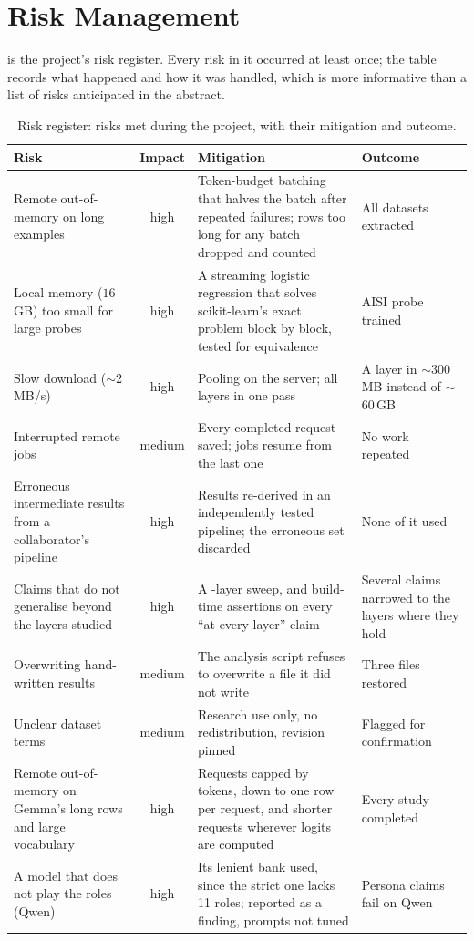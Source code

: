 \section{Risk Management}
\label{sec:risk}

 is the project's risk register. Every risk in it occurred at least once; the table
records what happened and how it was handled, which is more informative than a list of risks
anticipated in the abstract.

\begin{table}[t]
\centering
\small
\caption{Risk register: risks met during the project, with their mitigation and outcome.}
\label{tab:risk}
\begin{tabularx}{\linewidth}{@{}>{\raggedright\arraybackslash}p{3.0cm} c >{\raggedright\arraybackslash}X >{\raggedright\arraybackslash}p{3.1cm}@{}}
\toprule
Risk & Impact & Mitigation & Outcome \\
\midrule
Remote out-of-memory on long examples & high & Token-budget batching that halves the batch after
repeated failures; rows too long for any batch dropped and counted & All datasets extracted \\
Local memory ($16$\,GB) too small for large probes & high & A streaming logistic regression that
solves scikit-learn's exact problem block by block, tested for equivalence & AISI probe trained \\
Slow download ($\sim$2\,MB/s) & high & Pooling on the server; all layers in one pass & A layer in
$\sim$300\,MB instead of $\sim$60\,GB \\
Interrupted remote jobs & medium & Every completed request saved; jobs resume from the last one &
No work repeated \\
Erroneous intermediate results from a collaborator's pipeline & high & Results re-derived in an
independently tested pipeline; the erroneous set discarded & None of it used \\
Claims that do not generalise beyond the layers studied & high & A \V{depth-n}-layer sweep, and
build-time assertions on every ``at every layer'' claim & Several claims narrowed to the layers where
they hold \\
Overwriting hand-written results & medium & The analysis script refuses to overwrite a file it did
not write & Three files restored \\
Unclear dataset terms & medium & Research use only, no redistribution, revision pinned & Flagged
for confirmation \\
Remote out-of-memory on Gemma's long rows and large vocabulary & high & Requests capped by tokens,
down to one row per request, and shorter requests wherever logits are computed & Every study completed \\
A model that does not play the roles (Qwen) & high & Its lenient bank used, since the strict one lacks
11 roles; reported as a finding, prompts not tuned & Persona claims fail on Qwen \\
\bottomrule
\end{tabularx}
\end{table}

